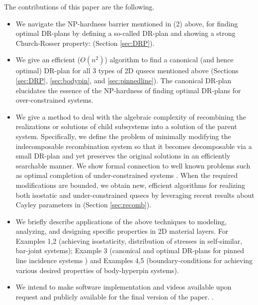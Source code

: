 The contributions of this paper are the following.
\begin{itemize}
  \item We navigate the NP-hardness barrier mentioned in (2) above,
  for finding optimal DR-plans by defining a so-called 
  DR-plan and showing a strong Church-Rosser property:  (Section \ref{sec:DRP}).

  \item We give an efficient ($O(n^2)$) algorithm to find a canonical
  (and hence optimal) DR-plan for all 3 types of 2D qusecs mentioned
  above (Sections \ref{sec:DRP}, \ref{sec:bodypin}, and
  \ref{sec:pinnedline}). The canonical DR-plan elucidates the essence
  of the NP-hardness of finding optimal DR-plans for over-constrained
  systems.

  \item We give a method to deal with the algebraic complexity of
  recombining the realizations or solutions of child subsystems into a
  solution of the parent system. Specifically, we define the problem
  of minimally modifying the indecomposable recombination system so
  that it becomes decomposable via a small DR-plan and yet preserves
  the original solutions in an efficiently searchable manner. We show
  formal connection to well known problems such as optimal completion
  of under-constrained systems \uncited. When the required
  modifications are bounded, we obtain new, efficient algorithms for
  realizing both isostatic and under-constrained qusecs by leveraging
  recent results about Cayley parameters in \uncited\uncited (Section
  \ref{sec:recomb}).

  \item We briefly describe applications of the above techniques to
  modeling, analyzing, and designing specific properties in 2D material
  layers. For Examples 1,2 (achieving isostaticity, distribution of
  stresses in self-similar, bar-joint systems); Example 3 (canonical
  and optimal DR-plans for pinned line incidence systems \uncited)
  and Examples 4,5 (boundary-conditions for achieving various desired
  properties of body-hyperpin systems).

  \item We intend to make software implementation and videos available
  upon request and publicly available for the final version of the
  paper.
  .
\end{itemize}
